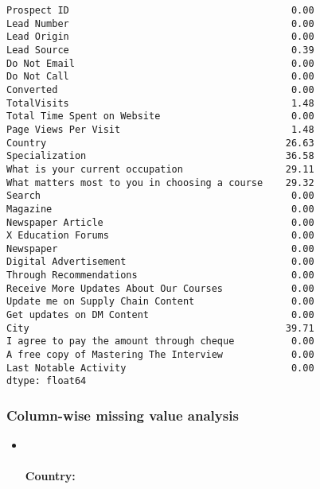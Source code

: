 \documentclass[11pt]{article}
\makeatletter
\newcommand{\boxspacing}{\kern\kvtcb@left@rule\kern\kvtcb@boxsep}
\newcommand{\prompt}[4]{
        \ttfamily\llap{{\color{#2}[#3]:\hspace{3pt}#4}}\vspace{-\baselineskip}
    }
\makeatother
\begin{document}
            \begin{tcolorbox}[breakable, size=fbox, boxrule=.5pt, pad at break*=1mm, opacityfill=0]
\prompt{Out}{outcolor}{8}{\boxspacing}
\begin{Verbatim}[commandchars=\\\{\}]
Prospect ID                                       0.00
Lead Number                                       0.00
Lead Origin                                       0.00
Lead Source                                       0.39
Do Not Email                                      0.00
Do Not Call                                       0.00
Converted                                         0.00
TotalVisits                                       1.48
Total Time Spent on Website                       0.00
Page Views Per Visit                              1.48
Country                                          26.63
Specialization                                   36.58
What is your current occupation                  29.11
What matters most to you in choosing a course    29.32
Search                                            0.00
Magazine                                          0.00
Newspaper Article                                 0.00
X Education Forums                                0.00
Newspaper                                         0.00
Digital Advertisement                             0.00
Through Recommendations                           0.00
Receive More Updates About Our Courses            0.00
Update me on Supply Chain Content                 0.00
Get updates on DM Content                         0.00
City                                             39.71
I agree to pay the amount through cheque          0.00
A free copy of Mastering The Interview            0.00
Last Notable Activity                             0.00
dtype: float64
\end{Verbatim}
\end{tcolorbox}
        
    \hypertarget{column-wise-missing-value-analysis}{%
\subsubsection{Column-wise missing value
analysis}\label{column-wise-missing-value-analysis}}

    \begin{itemize}
\item ~
  \hypertarget{country}{%
  \paragraph{Country:}\label{country}}
\end{itemize}
\end{document}
